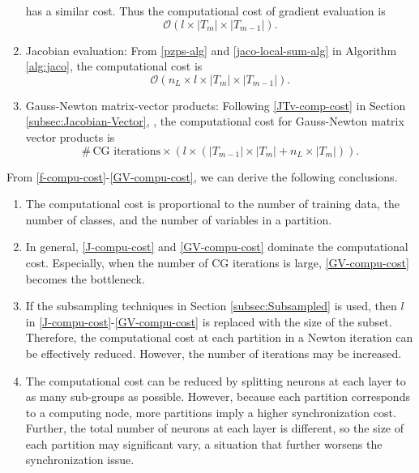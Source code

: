 \documentclass[12pt]{article}
\begin{document}
\begin{enumerate}[1.]
has a similar cost. Thus the computational cost of gradient evaluation is
\begin{equation}
\label{g-compu-cost}
\mathcal {O} ( l \times |T_m| \times |T_{m-1}|). 
\end{equation}
\item Jacobian evaluation:
From \eqref{pzps-alg} and \eqref{jaco-local-sum-alg} in Algorithm \ref{alg:jaco},
the computational cost is
\begin{equation}
\label{J-compu-cost}
\mathcal {O} (n_L \times l \times |T_m| \times |T_{m-1}|). 
\end{equation}
\item Gauss-Newton matrix-vector products:
Following \eqref{JTv-comp-cost} in Section \ref{subsec:Jacobian-Vector}, ,
the computational cost for Gauss-Newton matrix vector products is
\begin{equation}
\label{GV-compu-cost}
\#\, \mbox{CG iterations} \times \left( l \times \left(|T_{m-1}| \times |T_{m}| + n_L \times |T_m|\right) \right).
\end{equation}
\end{enumerate}
\par From \eqref{f-compu-cost}-\eqref{GV-compu-cost}, we can derive the following conclusions.
\begin{enumerate}[1.]
\item The computational cost is proportional to the number of training data, the number of classes, and the number of variables in a partition.
\item In general, \eqref{J-compu-cost} and \eqref{GV-compu-cost} dominate the computational cost. Especially, when the number of CG iterations is large,
\eqref{GV-compu-cost} becomes the bottleneck. 
\item If the subsampling techniques in Section \ref{subsec:Subsampled} is used, 
then $l$ in \eqref{J-compu-cost}-\eqref{GV-compu-cost} is replaced with the size of the subset. 
Therefore, the computational cost at each partition in a Newton iteration can be effectively reduced. However, the number of iterations may be increased.
\item The computational cost can be reduced by splitting neurons at each layer to as many sub-groups as possible. 
However, because each partition corresponds to a computing node, more partitions imply a higher synchronization cost. 
Further, the total number of neurons at each layer is different, so the size of each partition may significant vary, a situation that further worsens the synchronization issue.
\end{enumerate}
\end{document}
